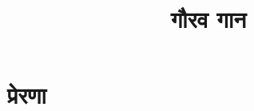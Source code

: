 \documentclass{book}
\title{गौरव गान}
\author{}
\date{}
\begin{document}
\maketitle
\tableofcontents

\chapter{प्रेरणा}


\end{document}
